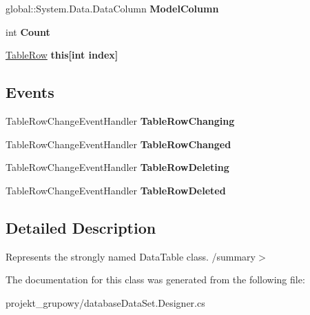 \begin{DoxyCompactItemize}
global\+::\+System.\+Data.\+Data\+Column {\bfseries Model\+Column}
\item 
\mbox{\label{classprojekt__grupowy_1_1database_data_set_1_1_table_data_table_a460329b01a789832435bd9bd767c9726}} 
int {\bfseries Count}
\item 
\mbox{\label{classprojekt__grupowy_1_1database_data_set_1_1_table_data_table_a524e3d79fb8566d481eba6cc1872ad8f}} 
\hyperlink{classprojekt__grupowy_1_1database_data_set_1_1_table_row}{Table\+Row} {\bfseries this\mbox{[}int index\mbox{]}}
\end{DoxyCompactItemize}
\subsection*{Events}
\begin{DoxyCompactItemize}
\item 
\mbox{\label{classprojekt__grupowy_1_1database_data_set_1_1_table_data_table_a2d8b09cf0c1630f4dc5c885713c81a34}} 
Table\+Row\+Change\+Event\+Handler {\bfseries Table\+Row\+Changing}
\item 
\mbox{\label{classprojekt__grupowy_1_1database_data_set_1_1_table_data_table_aa4c852d00e655523289fba77beca7a94}} 
Table\+Row\+Change\+Event\+Handler {\bfseries Table\+Row\+Changed}
\item 
\mbox{\label{classprojekt__grupowy_1_1database_data_set_1_1_table_data_table_a2c7e6f1cc9ce77d8b01a3cffbb17ecc5}} 
Table\+Row\+Change\+Event\+Handler {\bfseries Table\+Row\+Deleting}
\item 
\mbox{\label{classprojekt__grupowy_1_1database_data_set_1_1_table_data_table_a9a1f955e4fd5f1bad61b44f5cd97a561}} 
Table\+Row\+Change\+Event\+Handler {\bfseries Table\+Row\+Deleted}
\end{DoxyCompactItemize}


\subsection{Detailed Description}
Represents the strongly named Data\+Table class. /summary$>$ 

The documentation for this class was generated from the following file\+:\begin{DoxyCompactItemize}
\item 
projekt\+\_\+grupowy/database\+Data\+Set.\+Designer.\+cs\end{DoxyCompactItemize}
